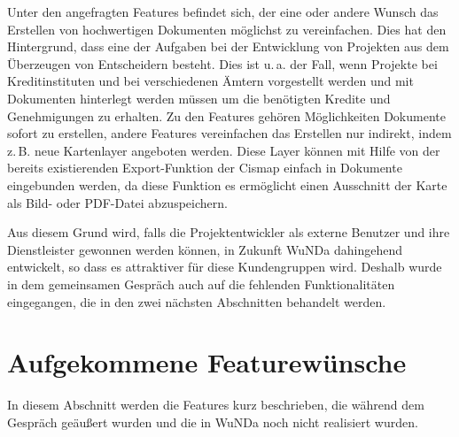 

Unter den angefragten Features befindet sich, der eine oder andere Wunsch das Erstellen von hochwertigen Dokumenten möglichst zu vereinfachen.
Dies hat den Hintergrund, dass eine der Aufgaben bei der Entwicklung von Projekten aus dem Überzeugen von Entscheidern besteht.
Dies ist u.\,a. der Fall, wenn Projekte bei Kreditinstituten und bei verschiedenen Ämtern vorgestellt werden und mit Dokumenten hinterlegt werden müssen um die benötigten Kredite und Genehmigungen zu erhalten.
Zu den Features gehören Möglichkeiten Dokumente sofort zu erstellen, andere Features vereinfachen das Erstellen nur indirekt, indem z.\,B. neue Kartenlayer angeboten werden.
Diese Layer können mit Hilfe von der bereits existierenden Export-Funktion der Cismap  einfach in Dokumente eingebunden werden, da diese Funktion es ermöglicht einen Ausschnitt der Karte als Bild- oder PDF-Datei abzuspeichern. 

Aus diesem Grund wird, falls die Projektentwickler als externe Benutzer und ihre Dienstleister gewonnen werden können, in Zukunft \ac{WuNDa} dahingehend entwickelt, so dass es attraktiver für diese Kundengruppen wird.
Deshalb wurde in dem gemeinsamen Gespräch auch auf die fehlenden Funktionalitäten eingegangen, die in den zwei nächsten Abschnitten behandelt werden.

\section{Aufgekommene Featurewünsche}
In diesem Abschnitt werden die Features kurz beschrieben, die während dem Gespräch geäußert wurden und die in \ac{WuNDa} noch nicht realisiert wurden.


